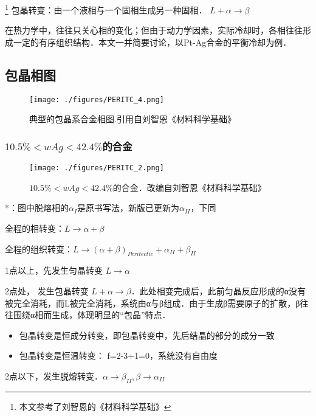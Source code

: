 
\footnote{本文参考了刘智恩的《材料科学基础》}
包晶转变：由一个液相与一个固相生成另一种固相． $L + \alpha \rightarrow \beta$

在热力学中，往往只关心相的变化；但由于动力学因素，实际冷却时，各相往往形成一定的有序组织结构．本文一并简要讨论，以Pt-Ag合金的平衡冷却为例．

\subsection{包晶相图}

\begin{figure}[ht]
\centering
\texttt{[image: ./figures/PERITC\_4.png]}
\caption{典型的包晶系合金相图.引用自刘智恩《材料科学基础》} \label{PERITC_fig4}
\end{figure}

\subsubsection{$10.5\%<wAg<42.4\%$的合金} 
\begin{figure}[ht]
\centering
\texttt{[image: ./figures/PERITC\_2.png]}
\caption{$10.5\%<wAg<42.4\%$的合金．改编自刘智恩《材料科学基础》} \label{PERITC_fig2}
\end{figure}
*：图中脱熔相的$\alpha_I$是原书写法，新版已更新为$\alpha_{II}$，下同

全程的相转变：$L \rightarrow \alpha+\beta$

全程的组织转变：$L \rightarrow (\alpha+\beta)_{Peritectic} + \alpha_{II} + \beta_{II}$

1点以上，先发生匀晶转变 $L \rightarrow \alpha$

2点处， 发生包晶转变 $L+ \alpha \rightarrow \beta$．此处相变完成后，此前匀晶反应形成的α没有被完全消耗，而L被完全消耗，系统由α与β组成．由于生成β需要原子的扩散，β往往围绕α相而生成，体现明显的“包晶”特点．
\begin{itemize}
\item 包晶转变是恒成分转变，即包晶转变中，先后结晶的部分的成分一致
\item 包晶转变是恒温转变： f=2-3+1=0，系统没有自由度
\end{itemize}

2点以下，发生脱熔转变．$\alpha \rightarrow \beta_{II}, \beta \rightarrow \alpha_{II}$


